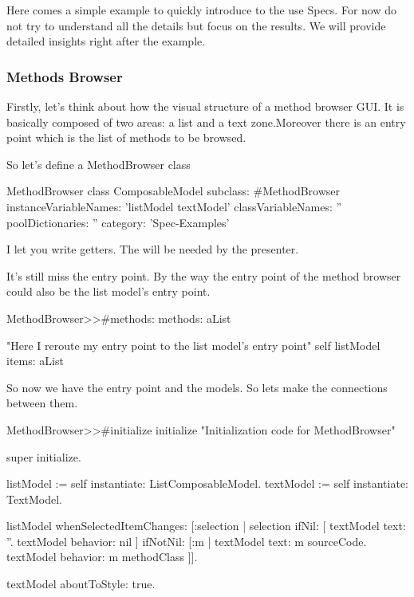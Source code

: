 \documentclass[a4paper,10pt,twoside]{book}
\begin{document}
Here comes a simple example to quickly introduce to the use Specs. For now do not try to understand all the details but focus on the results. We will provide detailed insights right after the example.

\subsubsection{Methods Browser}

Firstly, let's think about how the visual structure of a method browser GUI. It is basically composed of two areas: a list and a text zone.Moreover there is an entry point which is the list of methods to be browsed.

So let's define a MethodBrowser class

\begin{classdef}{MethodBrowser class}
ComposableModel subclass: #MethodBrowser
	instanceVariableNames: 'listModel textModel'
	classVariableNames: ''
	poolDictionaries: ''
	category: 'Spec-Examples'
\end{classdef}

I let you write getters. The will be needed by the presenter.

It's still miss the entry point. By the way the entry point of the method browser could also be the list model's entry point.

\begin{method}{MethodBrowser>>\#methods:}
methods: aList

	"Here I reroute my entry point to the list model's entry point"
	self listModel items: aList
\end{method}

So now we have the entry point and the models. So lets make the connections between them.

\begin{method}{MethodBrowser>>\#initialize}
initialize
	"Initialization code for MethodBrowser"

	super initialize.

	listModel := self instantiate: ListComposableModel.
	textModel := self instantiate: TextModel.
		
	listModel whenSelectedItemChanges: [:selection |
		selection
			ifNil: [
				textModel text: ''.
				textModel behavior: nil ]
			ifNotNil: [:m | 
				textModel text: m sourceCode.
				textModel behavior: m methodClass ]].
	
	textModel aboutToStyle: true.
\end{method}
\end{document}
